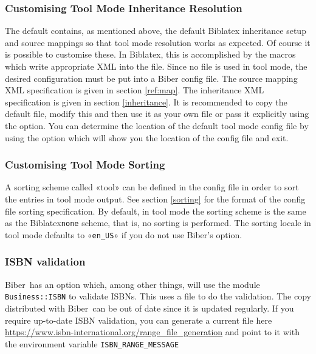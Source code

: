 \documentclass{ltxdockit}
\newcommand*{\biber}{Biber\xspace}
\newcommand*{\biblatex}{Biblatex\xspace}
\begin{document}
\subsubsection{Customising Tool Mode Inheritance Resolution}
The default  contains, as mentioned above, the
default \biblatex {} inheritance setup and \bibtex source
mappings so that tool mode resolution works as expected. Of course it is
possible to customise these. In \biblatex, this is accomplished by the
 macros which write appropriate XML into the
 file. Since no  file is used in tool mode, the
desired configuration must be put into a \biber config file. The source
mapping XML specification is given in section \ref{ref:map}. The inheritance
XML specification is given in section \ref{inheritance}. It is recommended
to copy the default  file, modify this and then use
it as your own  file or pass it explicitly using the
 option. You can determine the location of the default
tool mode config file by using the  option which will
show you the location of the config file and exit.

\subsubsection{Customising Tool Mode Sorting}
A sorting scheme called «tool» can be defined in the config file in
order to sort the entries in tool mode output. See section \ref{sorting}
for the format of the config file sorting specification. By default, in
tool mode the sorting scheme is the same as the \biblatex \texttt{none}
scheme, that is, no sorting is performed. The sorting locale in tool mode
defaults to «\texttt{en\_US}» if you do not use \biber's 
option.

\subsubsection{ISBN validation}
\biber\ has an option  which, among other things, will
use the module \verb+Business::ISBN+ to validate ISBNs. This uses a file
 to do the validation. The copy distributed with \biber\
can be out of date since it is updated regularly. If you require up-to-date ISBN
validation, you can generate a current \file{RangeMessage.xml} file here
\url{https://www.isbn-international.org/range_file_generation} and point to it
with the environment variable \verb+ISBN_RANGE_MESSAGE+
\bigskip
\end{document}
